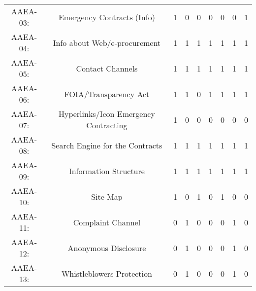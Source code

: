 \documentclass[a4paper, twoside]{report}
\begin{document}
\begin{table}[htbp]
\begin{adjustbox}{max width=\linewidth}
\begin{tabular}{rcccccccc}
    \multicolumn{1}{c}{AAEA-03:} & \multicolumn{1}{p{19em}}{\cellcolor[rgb]{ .749,  .749,  .749}Emergency Contracts (Info)} & \cellcolor[rgb]{ .749,  .749,  .749}1 & \cellcolor[rgb]{ .749,  .749,  .749}0 & \cellcolor[rgb]{ .749,  .749,  .749}0 & \cellcolor[rgb]{ .749,  .749,  .749}0 & \cellcolor[rgb]{ .749,  .749,  .749}0 & \cellcolor[rgb]{ .749,  .749,  .749}0 & \cellcolor[rgb]{ .749,  .749,  .749}1 \\
    \multicolumn{1}{c}{AAEA-04:} & \multicolumn{1}{p{19em}}{Info about Web/e-procurement} & 1     & 1     & 1     & 1     & 1     & 1     & 1 \\
    \multicolumn{1}{c}{AAEA-05:} & \multicolumn{1}{p{19em}}{Contact Channels} & 1     & 1     & 1     & 1     & 1     & 1     & 1 \\
    \multicolumn{1}{c}{AAEA-06:} & \multicolumn{1}{p{19em}}{FOIA/Transparency Act} & 1     & 1     & 0     & 1     & 1     & 1     & 1 \\
    \multicolumn{1}{c}{AAEA-07:} & \multicolumn{1}{p{19em}}{\cellcolor[rgb]{ .749,  .749,  .749}Hyperlinks/Icon Emergency Contracting} & \cellcolor[rgb]{ .749,  .749,  .749}1 & \cellcolor[rgb]{ .749,  .749,  .749}0 & \cellcolor[rgb]{ .749,  .749,  .749}0 & \cellcolor[rgb]{ .749,  .749,  .749}0 & \cellcolor[rgb]{ .749,  .749,  .749}0 & \cellcolor[rgb]{ .749,  .749,  .749}0 & \cellcolor[rgb]{ .749,  .749,  .749}0 \\
    \multicolumn{1}{c}{AAEA-08:} & \multicolumn{1}{p{19em}}{Search Engine for the Contracts} & 1     & 1     & 1     & 1     & 1     & 1     & 1 \\
    \multicolumn{1}{c}{AAEA-09:} & \multicolumn{1}{p{19em}}{Information Structure} & 1     & 1     & 1     & 1     & 1     & 1     & 1 \\
    \multicolumn{1}{c}{AAEA-10:} & \multicolumn{1}{p{19em}}{Site Map} & 1     & 0     & 1     & 0     & 1     & 0     & 0 \\
    \multicolumn{1}{c}{AAEA-11:} & \multicolumn{1}{p{19em}}{Complaint Channel} & 0     & 1     & 0     & 0     & 0     & 1     & 0 \\
    \multicolumn{1}{c}{AAEA-12:} & \multicolumn{1}{p{19em}}{\cellcolor[rgb]{ .749,  .749,  .749}Anonymous Disclosure} & \cellcolor[rgb]{ .749,  .749,  .749}0 & \cellcolor[rgb]{ .749,  .749,  .749}1 & \cellcolor[rgb]{ .749,  .749,  .749}0 & \cellcolor[rgb]{ .749,  .749,  .749}0 & \cellcolor[rgb]{ .749,  .749,  .749}0 & \cellcolor[rgb]{ .749,  .749,  .749}1 & \cellcolor[rgb]{ .749,  .749,  .749}0 \\
    \multicolumn{1}{c}{AAEA-13:} & \multicolumn{1}{p{19em}}{Whistleblowers Protection} & 0     & 1     & 0     & 0     & 0     & 1     & 0 \\

\end{tabular}
\end{adjustbox}
\end{table}
\end{document}
